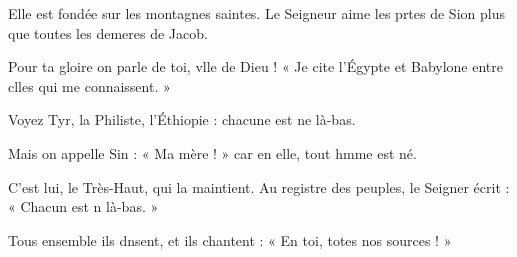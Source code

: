 \item Elle est fondée sur les montagnes saintes.\pscross{} Le Seigneur aime les prtes de Sion\psstar{} plus que toutes les demeres de Jacob.
\item Pour ta gloire on parle de toi, vlle de Dieu !\psstar{} « Je cite l’Égypte et Babylone entre clles qui me connaissent. »
\item Voyez Tyr, la Philiste, l’Éthiopie :\psstar{} chacune est ne là-bas.
\item Mais on appelle Sin : « Ma mère ! »\psstar{} car en elle, tout hmme est né. 
\item C’est lui, le Très-Haut, qui la maintient.\pscross{} Au registre des peuples, le Seigner écrit :\psstar{} « Chacun est n là-bas. »
\item Tous ensemble ils dnsent, et ils chantent :\psstar{} « En toi, totes nos sources ! »